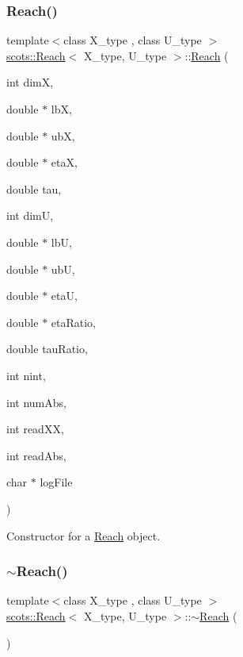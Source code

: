 \subsubsection{\texorpdfstring{Reach()}{Reach()}}
{\footnotesize\ttfamily template$<$class X\+\_\+type , class U\+\_\+type $>$ \\
\hyperlink{classscots_1_1Reach}{scots\+::\+Reach}$<$ X\+\_\+type, U\+\_\+type $>$\+::\hyperlink{classscots_1_1Reach}{Reach} (\begin{DoxyParamCaption}\item[{int}]{dimX,  }\item[{double $\ast$}]{lbX,  }\item[{double $\ast$}]{ubX,  }\item[{double $\ast$}]{etaX,  }\item[{double}]{tau,  }\item[{int}]{dimU,  }\item[{double $\ast$}]{lbU,  }\item[{double $\ast$}]{ubU,  }\item[{double $\ast$}]{etaU,  }\item[{double $\ast$}]{eta\+Ratio,  }\item[{double}]{tau\+Ratio,  }\item[{int}]{nint,  }\item[{int}]{num\+Abs,  }\item[{int}]{read\+XX,  }\item[{int}]{read\+Abs,  }\item[{char $\ast$}]{log\+File }\end{DoxyParamCaption})\hspace{0.3cm}{\ttfamily [inline]}}

Constructor for a \hyperlink{classscots_1_1Reach}{Reach} object. \mbox{\label{classscots_1_1Reach_a05425187c9015158f5495904c34342d0}} 
\subsubsection{\texorpdfstring{$\sim$\+Reach()}{~Reach()}}
{\footnotesize\ttfamily template$<$class X\+\_\+type , class U\+\_\+type $>$ \\
\hyperlink{classscots_1_1Reach}{scots\+::\+Reach}$<$ X\+\_\+type, U\+\_\+type $>$\+::$\sim$\hyperlink{classscots_1_1Reach}{Reach} (\begin{DoxyParamCaption}{ }\end{DoxyParamCaption})\hspace{0.3cm}{\ttfamily [inline]}}

